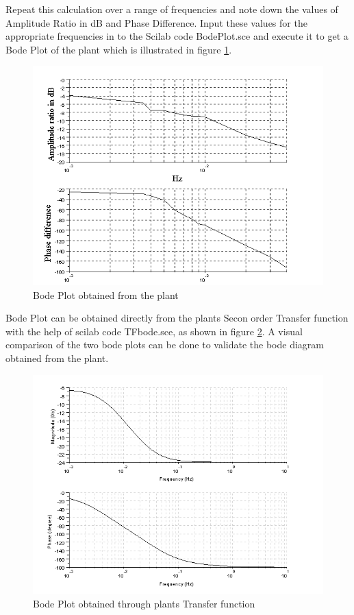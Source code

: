 Repeat this calculation over a range of frequencies and note down the values of Amplitude Ratio in dB and Phase Difference. Input these values for the appropriate frequencies in to the Scilab code {\ttfamily BodePlot.sce} and execute it to get a Bode Plot of the plant which is illustrated in figure \ref{bode_plot}.
\begin{figure}
\includegraphics[width=\linewidth]{sinetest_manual/bodeplot}
\caption{Bode Plot obtained from the plant}
\label{bode_plot}
\end{figure}

Bode Plot can be obtained directly from the plants Secon order Transfer function \cite{kmm09} with the help of scilab code {\ttfamily TFbode.sce}, as shown in figure \ref{tfbode}. A visual comparison of the two bode plots can be done to validate the bode diagram obtained from the plant.
\begin{figure}
\includegraphics[width=\linewidth]{sinetest_manual/plant_bode_tf}
\caption{Bode Plot obtained through plants Transfer function}
\label{tfbode}
\end{figure}

